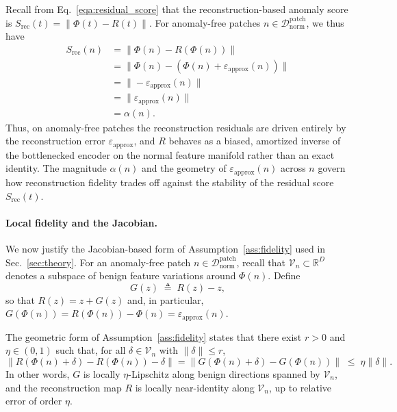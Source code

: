 \documentclass{article}
\theoremstyle{plain}
\theoremstyle{definition}
\theoremstyle{remark}
\begin{document}
Recall from Eq.~\eqref{eqa:residual_score} that the reconstruction-based
anomaly score is
$S_{\mathrm{rec}}(t) = \|\Phi(t) - R(t)\|$. For anomaly-free patches
$n\in\mathcal{D}^{\mathrm{patch}}_{\mathrm{norm}}$, we thus have
\begin{equation}
    \begin{aligned}
        S_{\mathrm{rec}}(n)
        &= \big\|\Phi(n) - R(\Phi(n))\big\| \\
        &= \big\|\Phi(n) - (\Phi(n) + \varepsilon_{\mathrm{approx}}(n))\big\| \\
        &= \big\|-\varepsilon_{\mathrm{approx}}(n)\big\| \\
        &= \big\|\varepsilon_{\mathrm{approx}}(n)\big\| \\
        &= \alpha(n).
    \end{aligned}
\end{equation}
Thus, on anomaly-free patches the reconstruction residuals are driven
entirely by the reconstruction error $\varepsilon_{\mathrm{approx}}$, and
$R$ behaves as a biased, amortized inverse of the bottlenecked encoder
on the normal feature manifold rather than an exact identity. The
magnitude $\alpha(n)$ and the geometry of
$\varepsilon_{\mathrm{approx}}(n)$ across $n$ govern how reconstruction
fidelity trades off against the stability of the residual score
$S_{\mathrm{rec}}(t)$.

\paragraph{Local fidelity and the Jacobian.}
We now justify the Jacobian-based form of
Assumption~\ref{ass:fidelity} used in Sec.~\ref{sec:theory}. For an
anomaly-free patch $n\in\mathcal{D}^{\mathrm{patch}}_{\mathrm{norm}}$,
recall that $\mathcal{V}_n\subset\mathbb{R}^D$ denotes a subspace of
benign feature variations around $\Phi(n)$. Define
\begin{equation}
    G(z) \;\triangleq\; R(z) - z,
\end{equation}
so that $R(z) = z + G(z)$ and, in particular,
$G(\Phi(n)) = R(\Phi(n)) - \Phi(n) = \varepsilon_{\mathrm{approx}}(n)$.

The geometric form of Assumption~\ref{ass:fidelity} states that there
exist $r>0$ and $\eta\in(0,1)$ such that, for all
$\delta\in\mathcal{V}_n$ with $\|\delta\|\le r$,
\begin{equation}
    \|R(\Phi(n)+\delta) - R(\Phi(n)) - \delta\|
    = \|G(\Phi(n)+\delta) - G(\Phi(n))\|
    \;\le\; \eta \|\delta\|.
    \label{eq:local_fid_G}
\end{equation}
In other words, $G$ is locally $\eta$-Lipschitz along benign directions
spanned by $\mathcal{V}_n$, and the reconstruction map $R$ is locally
near-identity along $\mathcal{V}_n$, up to relative error of order
$\eta$.
\end{document}
